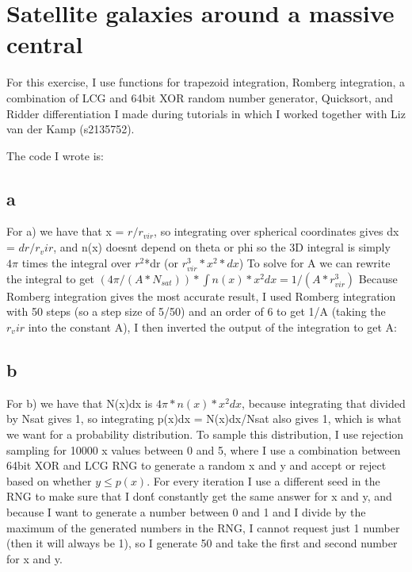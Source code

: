 \section{Satellite galaxies around a massive central}

For this exercise, I use functions for trapezoid integration, Romberg integration, a combination of 
LCG and 64bit XOR random number generator, Quicksort, and Ridder differentiation I made during tutorials in 
which I worked together with Liz van der Kamp (s2135752).


The code I wrote is:


\subsection*{a}

For a) we have that x = $r/r_{vir}$, so integrating over spherical coordinates gives dx = $dr/r_vir$, 
and n(x) doesnt depend on theta or phi so the 3D integral is simply $4\pi$ times the integral over 
$r^2$*dr (or $r_{vir}^3*x^2*dx$)
To solve for A we can rewrite the integral to get $(4\pi/(A*N_{sat}))*\int n(x)*x^2 dx = 1/(A*r_{vir}^3)$
Because Romberg integration gives the most accurate result, I used Romberg integration with 50 steps 
(so a step size of 5/50) and an order of 6 to get 1/A (taking the $r_vir$ into the constant A),
I then inverted the output of the integration to get A:


\subsection*{b}

For b) we have that N(x)dx is $4\pi*n(x)*x^2 dx$, because integrating that divided by Nsat gives 1, 
so integrating p(x)dx = N(x)dx/Nsat also gives 1, which is what we want for a probability distribution.
To sample this distribution, I use rejection sampling for 10000 x values between 0 and 5,
where I use a combination between 64bit XOR and LCG RNG to generate a random x and y and accept or reject
based on whether $y \leq p(x)$. For every iteration I use a different seed in the RNG to make sure that I 
don\'t constantly get the same answer for x and y, and because I want to generate a number between 0 and 1 
and I divide by the maximum of the generated numbers in the RNG, I cannot request just 1 number 
(then it will always be 1), so I generate 50 and take the first and second number for x and y.

